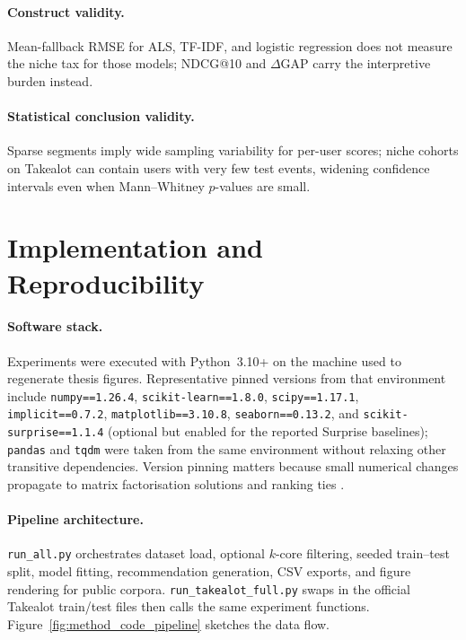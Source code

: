 \paragraph{Construct validity.}
Mean-fallback RMSE for ALS, TF-IDF, and logistic regression does not measure the niche tax for those models; NDCG@10 and $\Delta$GAP carry the interpretive burden instead.

\paragraph{Statistical conclusion validity.}
Sparse segments imply wide sampling variability for per-user scores; niche cohorts on Takealot can contain users with very few test events, widening confidence intervals even when Mann--Whitney $p$-values are small.

\section{Implementation and Reproducibility}
\label{sec:method_impl}

\paragraph{Software stack.}
Experiments were executed with Python~3.10+ on the machine used to regenerate thesis figures. Representative pinned versions from that environment include \texttt{numpy==1.26.4}, \texttt{scikit-learn==1.8.0}, \texttt{scipy==1.17.1}, \texttt{implicit==0.7.2}, \texttt{matplotlib==3.10.8}, \texttt{seaborn==0.13.2}, and \texttt{scikit-surprise==1.1.4} (optional but enabled for the reported Surprise baselines); \texttt{pandas} and \texttt{tqdm} were taken from the same environment without relaxing other transitive dependencies. Version pinning matters because small numerical changes propagate to matrix factorisation solutions and ranking ties \citep{ferrari2019progress}.

\paragraph{Pipeline architecture.}
\texttt{run\_all.py} orchestrates dataset load, optional $k$-core filtering, seeded train--test split, model fitting, recommendation generation, CSV exports, and figure rendering for public corpora. \texttt{run\_takealot\_full.py} swaps in the official Takealot train/test files then calls the same experiment functions. Figure~\ref{fig:method_code_pipeline} sketches the data flow.

